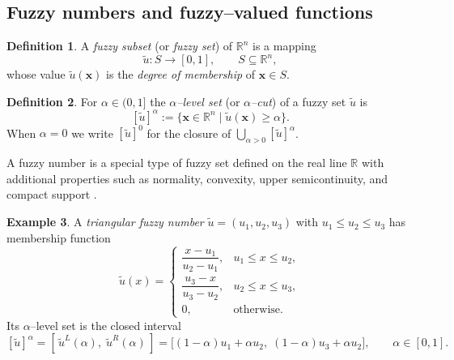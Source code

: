 \documentclass{article}
\theoremstyle{definition}
\newtheorem{maar}{Definition}[section]
\newtheorem{example}[maar]{Example}
\begin{document}
\subsection{Fuzzy numbers and fuzzy–valued functions}

\begin{maar}
A \emph{fuzzy subset} (or \emph{fuzzy set}) of\/ $\mathbb{R}^{n}$ is a mapping
\[
    \widetilde{u} : S \longrightarrow [0,1],
    \qquad S\subseteq\mathbb{R}^{n},
\]
whose value $\widetilde{u}(\boldsymbol x)$ is the \emph{degree of membership} of
$\boldsymbol x\in S$.
\end{maar}

\begin{maar}
For $\alpha\in(0,1]$ the \emph{$\alpha$–level set} (or \emph{$\alpha$–cut}) of a fuzzy set
$\widetilde{u}$ is
\[
    [\widetilde{u}]^{\alpha}
    :=\bigl\{\boldsymbol x\in\mathbb{R}^{n}\mid \widetilde{u}(\boldsymbol x)\ge\alpha\bigr\}.
\]
When $\alpha=0$ we write $[\widetilde{u}]^{0}$ for the closure of
$\bigcup_{\alpha>0}[\widetilde{u}]^{\alpha}$.
\end{maar}

A fuzzy number is a special type of fuzzy set defined on the real line $\mathbb R$ with additional properties such as normality, convexity, upper semicontinuity, and compact support \cite{Zim}. 


\begin{example}\label{ex:TFN}
A \emph{triangular fuzzy number}\/
$\widetilde{u}=(u_{1},u_{2},u_{3})$ with $u_{1}\le u_{2}\le u_{3}$ has membership
function
\[
    \widetilde{u}(x)=
    \begin{cases}
        \dfrac{x-u_{1}}{u_{2}-u_{1}}, & u_{1}\le x\le u_{2},\\[6pt]
        \dfrac{u_{3}-x}{u_{3}-u_{2}}, & u_{2}\le x\le u_{3},\\[6pt]
        0, & \text{otherwise.}
    \end{cases}
\]
Its $\alpha$–level set is the closed interval
\[
    [\widetilde{u}]^{\alpha}
    =[\,\widetilde{u}^{L}(\alpha),\;\widetilde{u}^{R}(\alpha)\,]
    =\bigl[(1-\alpha)u_{1}+\alpha u_{2},\; (1-\alpha)u_{3}+\alpha u_{2}\bigr],
    \qquad \alpha\in[0,1].
\]
\end{example}
\end{document}
